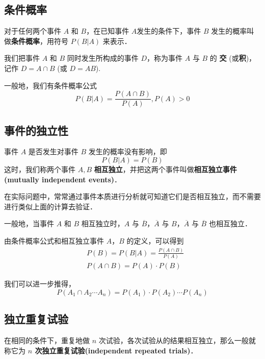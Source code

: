 
\begin{issues}
\issueDraft
\end{issues}

\subsection{条件概率}
对于任何两个事件 $A$ 和 $B$，在已知事件 $A$发生的条件下，事件 $B$ 发生的概率叫做\textbf{条件概率}，用符号 $P(B|A)$ 来表示．

我们把事件 $A$ 和 $B$ 同时发生所构成的事件 $D$，称为事件 $A$ 与 $B$ 的 \textbf{交} (或\textbf{积})，记作 $D = A \cap B$ (或 $D = AB$).

一般地，我们有条件概率公式
\begin{equation}
P(B|A) = \frac{P(A \cap B)}{P(A)},P(A)>0
\end{equation}

\subsection{事件的独立性}
事件 $A$ 是否发生对事件 $B$ 发生的概率没有影响，即
\begin{equation}
P(B|A) = P(B)
\end{equation}
这时，我们称两个事件 $A,B$ \textbf{相互独立}，并把这两个事件叫做\textbf{相互独立事件(mutually independent events)}．

在实际问题中，常常通过事件本质进行分析就可知道它们是否相互独立，而不需要进行类似上面的计算去验证．

一般地，当事件 $A$ 和 $B$ 相互独立时，$A$ 与 $\overline{B}$，$\overline{A}$ 与 $B$，$\overline{A}$ 与 $\overline{B}$ 也相互独立．

由条件概率公式和相互独立事件 $A$，$B$ 的定义，可以得到
\begin{equation}
\begin{aligned}
&P(B) = P(B|A) = \frac{P(A \cap B)}{P(A)} \\
&P(A\cap B) = P(A) \cdot P(B)
\end{aligned}
\end{equation}

我们可以进一步推得，
\begin{equation}
P(A_1\cap A_2 \cdots A_n) = P(A_1) \cdot P(A_2) \cdots P(A_n)
\end{equation}

\subsection{独立重复试验}
在相同的条件下，重复地做 $n$ 次试验，各次试验从的结果相互独立，那么一般就称它为 \textbf{ $n$ 次独立重复试验(independent repeated trials)}．

